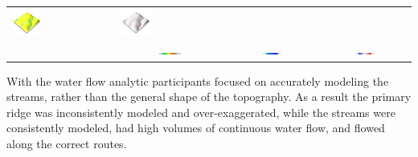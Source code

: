 \documentclass[prodmode,acmtochi]{acmsmall} %
\begin{document}
\begin{table}
{\begin{tabular}{m{} m{} m{} m{}}
\includegraphics[width=0.3\textwidth]{images/render_3d/mean_depth_5.png} &
\includegraphics[width=0.3\textwidth]{images/render_3d/mean_depth_difference_5.png}\\
%
& 
\multicolumn{1}{c}{\includegraphics[width=0.22\textwidth]{images/legends/elevation_legend_5.pdf}} &
\multicolumn{1}{c}{\includegraphics[width=0.22\textwidth]{images/legends/depth_legend.pdf}} &
\multicolumn{1}{c}{\includegraphics[width=0.22\textwidth]{images/legends/depth_diff_legend.pdf}}\\
%
\bottomrule
\end{tabular}}
\label{table:water_flow_experiment} 
\end{table}

With the water flow analytic
participants focused on accurately modeling the streams, 
rather than the general shape of the topography. 
As a result the primary ridge was inconsistently modeled and over-exaggerated,
while the streams were consistently modeled,
had high volumes of continuous water flow, 
and flowed along the correct routes.
\end{document}
